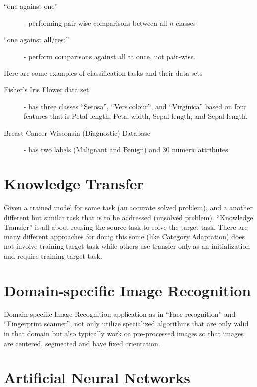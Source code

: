 \begin{description}
\item [``one against one''] - performing pair-wise comparisons between all \(n\) classes
\item [``one against all/rest''] - perform comparisons against all at once, not pair-wise.
\end{description}

Here are some examples of classification tasks and their data sets

\begin{description}
\item [Fisher's  Iris Flower data set] - has three classes ``Setosa'', ``Versicolour'', and ``Virginica''
based on four features that is Petal length, Petal width, Sepal length, and Sepal length\autocite{fisher1936use}.
\item [Breast Cancer Wisconsin (Diagnostic) Database] - has two labels (Malignant and Benign)
and 30 numeric attributes\autocite{street1993nuclear}\autocite{wolberg1994machine}\autocite{mangasarian1995breast}.
\end{description}

\section{Knowledge Transfer}\label{transfer}

Given a trained model for some task (an accurate solved problem),
and a another different but similar task that is to be addressed (unsolved problem).
``Knowledge Transfer'' is all about reusing the source task to solve the target task.
There are many different approaches for doing this some (like Category Adaptation)
does not involve training target task while others use transfer only as an initialization
and require training target task.


\section{Domain-specific Image Recognition}

Domain-specific Image Recognition application as in ``Face recognition'' and ``Fingerprint scanner'',
not only utilize specialized algorithms that are only valid in that domain but also typically work
on pre-processed images so that images are centered, segmented and have fixed orientation.

\section{Artificial Neural Networks}

